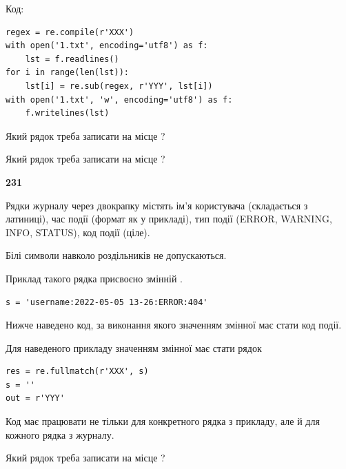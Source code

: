Код:



\begin{verbatim}
regex = re.compile(r'XXX')
with open('1.txt', encoding='utf8') as f:
    lst = f.readlines()
for i in range(len(lst)):
    lst[i] = re.sub(regex, r'YYY', lst[i])
with open('1.txt', 'w', encoding='utf8') as f:
    f.writelines(lst)
\end{verbatim}







Який рядок треба записати на місце  ?\par
\vspace{5mm}


Який рядок треба записати на місце  ?\par


\newpage

{\begin {center}\textbf{ 231}\end {center}}\par
Рядки журналу через двокрапку містять ім'я користувача (складається з латиниці), час події (фор\-мат як у прикладі), тип події (ERROR, WARNING, INFO, STATUS), код події (ціле).

Білі символи навколо роздільників не допускаються.

Приклад такого рядка присвоєно змінній .



\begin{verbatim}
s = 'username:2022-05-05 13-26:ERROR:404'
\end{verbatim}


Нижче наведено код, за виконання якого значенням змінної  має стати код події.

Для наведеного прикладу значенням змінної  має стати рядок 



\begin{verbatim}
res = re.fullmatch(r'XXX', s)
s = ''
out = r'YYY'
\end{verbatim}


Код має працювати не тільки для конкретного рядка з прикладу, але й для кожного рядка з журналу.




Який рядок треба записати на місце  ?\par
\vspace{5mm}


